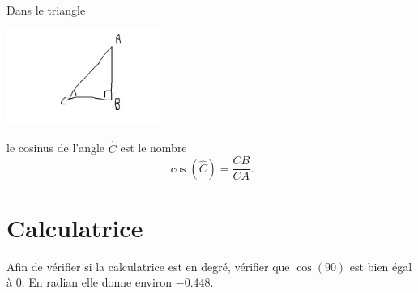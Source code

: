 \begin{example}
    Dans le triangle
    \begin{center}
        \includegraphics[width=5cm]{faux_ex_adj.pdf}
    \end{center}
    le cosinus de l'angle \( \hat C\) est le nombre
    \begin{equation}
        \cos(\hat C)=\frac{ CB }{ CA }.
    \end{equation}
\end{example}

\section{Calculatrice}



Afin de vérifier si la calculatrice est en degré, vérifier que \( \cos(90)\) est bien égal à \( 0\). En radian elle donne environ \( -0.448\).


